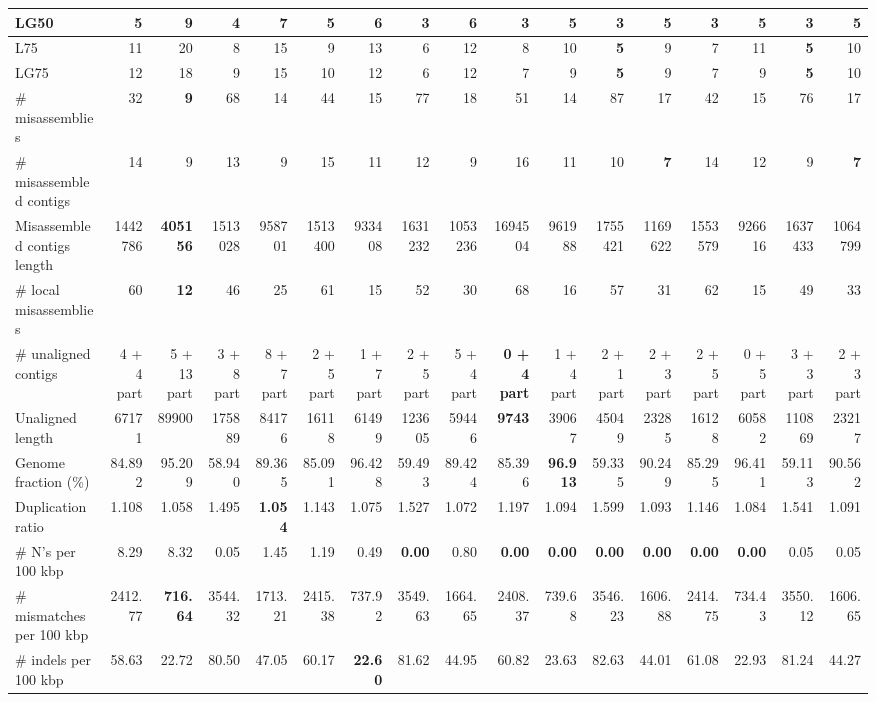 \documentclass[12pt,a4paper]{article}
\begin{document}
\begin{table}[ht]
\begin{center}
\begin{tabular}{|l*{16}{|r}|}
LG50 & 5 & 9 & 4 & 7 & 5 & 6 & {\bf 3} & 6 & {\bf 3} & 5 & {\bf 3} & 5 & {\bf 3} & 5 & {\bf 3} & 5 \\ \hline
L75 & 11 & 20 & 8 & 15 & 9 & 13 & 6 & 12 & 8 & 10 & {\bf 5} & 9 & 7 & 11 & {\bf 5} & 10 \\ \hline
LG75 & 12 & 18 & 9 & 15 & 10 & 12 & 6 & 12 & 7 & 9 & {\bf 5} & 9 & 7 & 9 & {\bf 5} & 10 \\ \hline
\# misassemblies & 32 & {\bf 9} & 68 & 14 & 44 & 15 & 77 & 18 & 51 & 14 & 87 & 17 & 42 & 15 & 76 & 17 \\ \hline
\# misassembled contigs & 14 & 9 & 13 & 9 & 15 & 11 & 12 & 9 & 16 & 11 & 10 & {\bf 7} & 14 & 12 & 9 & {\bf 7} \\ \hline
Misassembled contigs length & 1442786 & {\bf 405156} & 1513028 & 958701 & 1513400 & 933408 & 1631232 & 1053236 & 1694504 & 961988 & 1755421 & 1169622 & 1553579 & 926616 & 1637433 & 1064799 \\ \hline
\# local misassemblies & 60 & {\bf 12} & 46 & 25 & 61 & 15 & 52 & 30 & 68 & 16 & 57 & 31 & 62 & 15 & 49 & 33 \\ \hline
\# unaligned contigs & 4 + 4 part & 5 + 13 part & 3 + 8 part & 8 + 7 part & 2 + 5 part & 1 + 7 part & 2 + 5 part & 5 + 4 part & {\bf 0 + 4 part} & 1 + 4 part & 2 + 1 part & 2 + 3 part & 2 + 5 part & 0 + 5 part & 3 + 3 part & 2 + 3 part \\ \hline
Unaligned length & 67171 & 89900 & 175889 & 84176 & 16118 & 61499 & 123605 & 59446 & {\bf 9743} & 39067 & 45049 & 23285 & 16128 & 60582 & 110869 & 23217 \\ \hline
Genome fraction (\%) & 84.892 & 95.209 & 58.940 & 89.365 & 85.091 & 96.428 & 59.493 & 89.424 & 85.396 & {\bf 96.913} & 59.335 & 90.249 & 85.295 & 96.411 & 59.113 & 90.562 \\ \hline
Duplication ratio & 1.108 & 1.058 & 1.495 & {\bf 1.054} & 1.143 & 1.075 & 1.527 & 1.072 & 1.197 & 1.094 & 1.599 & 1.093 & 1.146 & 1.084 & 1.541 & 1.091 \\ \hline
\# N's per 100 kbp & 8.29 & 8.32 & 0.05 & 1.45 & 1.19 & 0.49 & {\bf 0.00} & 0.80 & {\bf 0.00} & {\bf 0.00} & {\bf 0.00} & {\bf 0.00} & {\bf 0.00} & {\bf 0.00} & 0.05 & 0.05 \\ \hline
\# mismatches per 100 kbp & 2412.77 & {\bf 716.64} & 3544.32 & 1713.21 & 2415.38 & 737.92 & 3549.63 & 1664.65 & 2408.37 & 739.68 & 3546.23 & 1606.88 & 2414.75 & 734.43 & 3550.12 & 1606.65 \\ \hline
\# indels per 100 kbp & 58.63 & 22.72 & 80.50 & 47.05 & 60.17 & {\bf 22.60} & 81.62 & 44.95 & 60.82 & 23.63 & 82.63 & 44.01 & 61.08 & 22.93 & 81.24 & 44.27 \\ \hline

\end{tabular}
\end{center}
\end{table}
\end{document}
